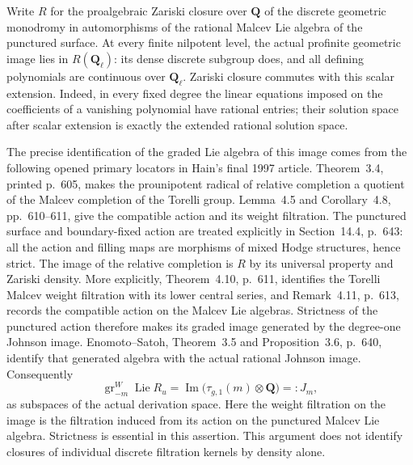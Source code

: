 Write $R$ for the proalgebraic Zariski closure over
$\mathbf Q$ of the discrete geometric monodromy in
automorphisms of the rational Malcev Lie algebra of
the punctured surface. At every finite nilpotent level,
the actual profinite geometric image lies in
$R(\mathbf Q_\ell)$: its dense discrete subgroup does,
and all defining polynomials are continuous over
$\mathbf Q_\ell$. Zariski closure commutes with this
scalar extension. Indeed, in every fixed degree the
linear equations imposed on the coefficients of a
vanishing polynomial have rational entries; their
solution space after scalar extension is exactly the
extended rational solution space.

The precise identification of the graded Lie algebra
of this image comes from the following opened primary
locators in Hain's final 1997 article. Theorem~3.4,
printed p.~605, makes the prounipotent radical of
relative completion a quotient of the Malcev
completion of the Torelli group. Lemma~4.5 and
Corollary~4.8, pp.~610--611, give the compatible
action and its weight filtration. The punctured
surface and boundary-fixed action are treated
explicitly in Section~14.4, p.~643: all the action
and filling maps are morphisms of mixed Hodge
structures, hence strict. The image of the relative
completion is $R$ by its universal property and
Zariski density. More explicitly, Theorem~4.10,
p.~611, identifies the Torelli Malcev weight
filtration with its lower central series, and
Remark~4.11, p.~613, records the compatible action
on the Malcev Lie algebras. Strictness of the
punctured action therefore makes its graded image
generated by the degree-one Johnson image.
Enomoto--Satoh, Theorem~3.5 and Proposition~3.6,
p.~640, identify that generated algebra with
the actual rational Johnson image. Consequently
\[
 \operatorname{gr}_{-m}^W\operatorname{Lie}R_u
   =\operatorname{Im}\bigl(\tau_{g,1}(m)\otimes\mathbf Q\bigr)
   =:J_m,                                                  \tag{G3.2}
\]
as subspaces of the actual derivation space. Here the
weight filtration on the image is the filtration
induced from its action on the punctured Malcev Lie
algebra. Strictness is essential in this assertion.
This argument does not identify closures of individual
discrete filtration kernels by density alone.

